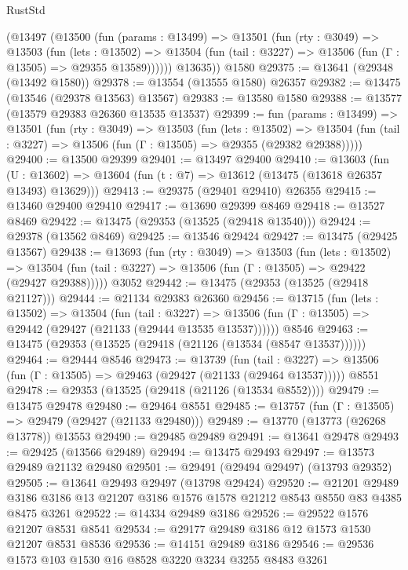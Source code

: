 \begin{lexlean}{RustStd}
\begin{coremodule}
      (@13497
        (@13500
          (fun (params : @13499) =>
          @13501
            (fun (rty : @3049) =>
            @13503
              (fun (lets : @13502) =>
              @13504 (fun (tail : @3227) => @13506 (fun (Γ : @13505) => @29355 @13589))))))
        @13635))
    @1580
@29375 := @13641 (@29348 (@13492 @1580))
@29378 := @13554 (@13555 @1580) @26357
@29382 := @13475 (@13546 (@29378 @13563) @13567)
@29383 := @13580 @1580
@29388 := @13577 (@13579 @29383 @26360 @13535 @13537)
@29399 := fun (params : @13499) =>
  @13501
    (fun (rty : @3049) =>
    @13503
      (fun (lets : @13502) =>
      @13504 (fun (tail : @3227) => @13506 (fun (Γ : @13505) => @29355 (@29382 @29388)))))
@29400 := @13500 @29399
@29401 := @13497 @29400
@29410 := @13603
    (fun (U : @13602) => @13604 (fun (t : @7) => @13612 (@13475 (@13618 @26357 @13493) @13629)))
@29413 := @29375 (@29401 @29410) @26355
@29415 := @13460 @29400 @29410
@29417 := @13690 @29399 @8469
@29418 := @13527 @8469
@29422 := @13475 (@29353 (@13525 (@29418 @13540)))
@29424 := @29378 (@13562 @8469)
@29425 := @13546 @29424
@29427 := @13475 (@29425 @13567)
@29438 := @13693
    (fun (rty : @3049) =>
    @13503
      (fun (lets : @13502) =>
      @13504 (fun (tail : @3227) => @13506 (fun (Γ : @13505) => @29422 (@29427 @29388)))))
    @3052
@29442 := @13475 (@29353 (@13525 (@29418 @21127)))
@29444 := @21134 @29383 @26360
@29456 := @13715
    (fun (lets : @13502) =>
    @13504
      (fun (tail : @3227) =>
      @13506 (fun (Γ : @13505) => @29442 (@29427 (@21133 (@29444 @13535 @13537))))))
    @8546
@29463 := @13475 (@29353 (@13525 (@29418 (@21126 (@13534 (@8547 @13537))))))
@29464 := @29444 @8546
@29473 := @13739
    (fun (tail : @3227) => @13506 (fun (Γ : @13505) => @29463 (@29427 (@21133 (@29464 @13537)))))
    @8551
@29478 := @29353 (@13525 (@29418 (@21126 (@13534 @8552))))
@29479 := @13475 @29478
@29480 := @29464 @8551
@29485 := @13757 (fun (Γ : @13505) => @29479 (@29427 (@21133 @29480)))
@29489 := @13770 (@13773 (@26268 @13778)) @13553
@29490 := @29485 @29489
@29491 := @13641 @29478
@29493 := @29425 (@13566 @29489)
@29494 := @13475 @29493
@29497 := @13573 @29489 @21132 @29480
@29501 := @29491 (@29494 @29497) (@13793 @29352)
@29505 := @13641 @29493 @29497 (@13798 @29424)
@29520 := @21201
    @29489
    @3186
    @3186
    @13
    @21207
    @3186
    @1576
    @1578
    @21212
    @8543
    @8550
    @83
    @4385
    @8475
    @3261
@29522 := @14334 @29489 @3186
@29526 := @29522 @1576 @21207 @8531 @8541
@29534 := @29177 @29489 @3186 @12 @1573 @1530 @21207 @8531 @8536
@29536 := @14151 @29489 @3186
@29546 := @29536 @1573 @103 @1530 @16 @8528 @3220 @3234 @3255 @8483 @3261

\end{coremodule}
\end{lexlean}
